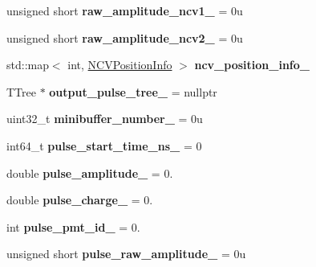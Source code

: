 \begin{DoxyCompactItemize}
\item 
\hypertarget{classPhaseITreeMaker_a02aa5dec1ed25dbbc69d6d555daa39e8}{
unsigned short {\bfseries raw\_\-amplitude\_\-ncv1\_\-} = 0u}
\label{classPhaseITreeMaker_a02aa5dec1ed25dbbc69d6d555daa39e8}

\item 
\hypertarget{classPhaseITreeMaker_a3753af4c4913247283fafc4f966f53ce}{
unsigned short {\bfseries raw\_\-amplitude\_\-ncv2\_\-} = 0u}
\label{classPhaseITreeMaker_a3753af4c4913247283fafc4f966f53ce}

\item 
\hypertarget{classPhaseITreeMaker_a874c9efb242b5b92e8f8f90c6fd4f23b}{
std::map$<$ int, \hyperlink{structNCVPositionInfo}{NCVPositionInfo} $>$ {\bfseries ncv\_\-position\_\-info\_\-}}
\label{classPhaseITreeMaker_a874c9efb242b5b92e8f8f90c6fd4f23b}

\item 
\hypertarget{classPhaseITreeMaker_aceed975ee31a653ad428312ffed02f97}{
TTree $\ast$ {\bfseries output\_\-pulse\_\-tree\_\-} = nullptr}
\label{classPhaseITreeMaker_aceed975ee31a653ad428312ffed02f97}

\item 
\hypertarget{classPhaseITreeMaker_a8cbadc4026164224e74e32de446a8e15}{
uint32\_\-t {\bfseries minibuffer\_\-number\_\-} = 0u}
\label{classPhaseITreeMaker_a8cbadc4026164224e74e32de446a8e15}

\item 
\hypertarget{classPhaseITreeMaker_a83562863bc7bce788d917cd40d31dfe7}{
int64\_\-t {\bfseries pulse\_\-start\_\-time\_\-ns\_\-} = 0}
\label{classPhaseITreeMaker_a83562863bc7bce788d917cd40d31dfe7}

\item 
\hypertarget{classPhaseITreeMaker_aa470eceac054608c14062606d64e6e5f}{
double {\bfseries pulse\_\-amplitude\_\-} = 0.}
\label{classPhaseITreeMaker_aa470eceac054608c14062606d64e6e5f}

\item 
\hypertarget{classPhaseITreeMaker_a78af37dbe76387f64abb9a82e12842c3}{
double {\bfseries pulse\_\-charge\_\-} = 0.}
\label{classPhaseITreeMaker_a78af37dbe76387f64abb9a82e12842c3}

\item 
\hypertarget{classPhaseITreeMaker_a13e66292551f2732d9091ac454178848}{
int {\bfseries pulse\_\-pmt\_\-id\_\-} = 0.}
\label{classPhaseITreeMaker_a13e66292551f2732d9091ac454178848}

\item 
\hypertarget{classPhaseITreeMaker_a23f2da00ca69a52485044a39f2bc9ee0}{
unsigned short {\bfseries pulse\_\-raw\_\-amplitude\_\-} = 0u}
\label{classPhaseITreeMaker_a23f2da00ca69a52485044a39f2bc9ee0}


\end{DoxyCompactItemize}
